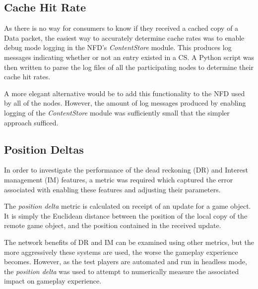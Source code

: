 \subsection{Cache Hit Rate}
As there is no way for consumers to know if they received a cached copy of a Data packet, the easiest way to accurately determine cache rates was to enable debug mode logging in the NFD's \textit{ContentStore} module. This produces log messages indicating whether or not an entry existed in a CS. A Python script was then written to parse the log files of all the participating nodes to determine their cache hit rates.

A more elegant alternative would be to add this functionality to the NFD used by all of the nodes. However, the amount of log messages produced by enabling logging of the \textit{ContentStore} module was sufficiently small that the simpler approach sufficed.

\subsection{Position Deltas}
In order to investigate the performance of the dead reckoning (DR) and Interest management (IM) features, a metric was required which captured the error associated with enabling these features and adjusting their parameters.

The \textit{position delta} metric is calculated on receipt of an update for a game object. It is simply the Euclidean distance between the position of the local copy of the remote game object, and the position contained in the received update. 

The network benefits of DR and IM can be examined using other metrics, but the more aggressively these systems are used, the worse the gameplay experience becomes. However, as the test players are automated and run in headless mode, the \textit{position delta} was used to attempt to numerically measure the associated impact on gameplay experience.


